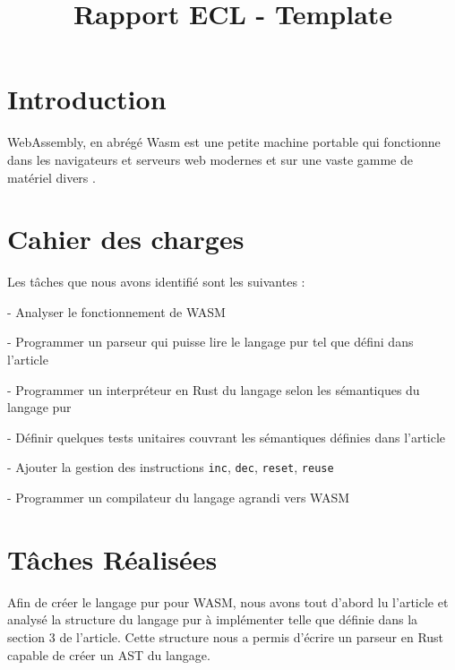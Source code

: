 \documentclass{rapportECL}
\title{Rapport ECL - Template} %
\begin{document}





\fairemarges %
\fairepagedegarde %
\tabledematieres %

\section{Introduction}
WebAssembly, en abrégé Wasm est une petite machine portable qui fonctionne dans les navigateurs et serveurs web modernes et sur une vaste gamme de matériel divers
\cite{jesuisundev_comprendre_2020}\cite{noauthor_webassembly_2023}.
\section{Cahier des charges}
Les tâches que nous avons identifié sont les suivantes :

- Analyser le fonctionnement de WASM

- Programmer un parseur qui puisse lire le langage pur tel que défini dans l'article\cite{ullrich_counting_2020}

- Programmer un interpréteur en Rust du langage selon les sémantiques du langage pur

- Définir quelques tests unitaires couvrant les sémantiques définies dans l'article\cite{ullrich_counting_2020}

- Ajouter la gestion des instructions \verb|inc|, \verb|dec|, \verb|reset|, \verb|reuse|

- Programmer un compilateur du langage agrandi vers WASM

\section{Tâches Réalisées}

Afin de créer le langage pur pour WASM, nous avons tout d'abord lu l'article\cite{ullrich_counting_2020} et analysé la structure du langage pur à implémenter telle que définie dans la section 3 de l'article\cite{ullrich_counting_2020}.
Cette structure nous a permis d'écrire un parseur en Rust capable de créer un AST du langage.
\end{document}
